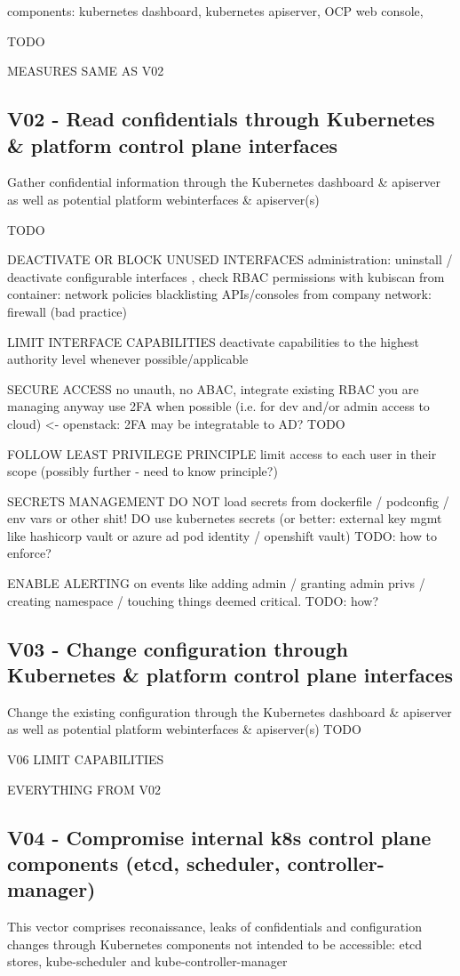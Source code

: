 components: kubernetes dashboard, kubernetes apiserver, OCP web console, 

TODO

MEASURES SAME AS V02

\subsection{V02 - Read confidentials through Kubernetes \& platform control plane interfaces}
Gather confidential information through the Kubernetes dashboard \& apiserver as well as potential platform webinterfaces \& apiserver(s)

TODO

DEACTIVATE OR BLOCK UNUSED INTERFACES
	administration: uninstall / deactivate configurable interfaces , check RBAC permissions with kubiscan
	from container: network policies blacklisting APIs/consoles
	from company network: firewall (bad practice)
	
	
LIMIT INTERFACE CAPABILITIES
	deactivate capabilities to the highest authority level  whenever possible/applicable
	
SECURE ACCESS
	no unauth, no ABAC, integrate existing RBAC you are managing anyway
	use 2FA when possible (i.e. for dev and/or admin access to cloud) <- openstack: 2FA may be integratable to AD? TODO
	
FOLLOW LEAST PRIVILEGE PRINCIPLE
	limit access to each user in their scope (possibly further - need to know principle?)
	
SECRETS MANAGEMENT
	DO NOT load secrets from dockerfile / podconfig / env vars or other shit! DO use kubernetes secrets (or better: external key mgmt like hashicorp vault or azure ad pod identity / openshift vault) TODO: how to enforce?
	
ENABLE ALERTING
	on events like adding admin / granting admin privs / creating namespace / touching things deemed critical. TODO: how?

\subsection{V03 - Change configuration through Kubernetes \& platform control plane interfaces}
Change the existing configuration through the Kubernetes dashboard \& apiserver as well as potential platform webinterfaces \& apiserver(s)
TODO

V06 LIMIT CAPABILITIES

EVERYTHING FROM V02

\subsection{V04 - Compromise internal k8s control plane components (etcd, scheduler, controller-manager)}
This vector comprises reconaissance, leaks of confidentials and configuration changes through Kubernetes components not intended to be accessible: etcd stores, kube-scheduler and kube-controller-manager


